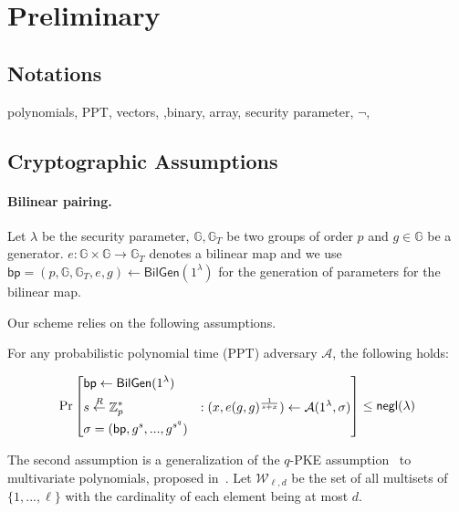 \section{Preliminary}
\label{sec::prelim}

\subsection{Notations}

polynomials, PPT, vectors, ,binary, array, security parameter, $\neg$,

\subsection{Cryptographic Assumptions}

\paragraph{Bilinear pairing.} Let $\lambda$ be the security parameter, $\mathbb{G}, \mathbb{G}_T$ be two groups of order $p$ and $g\in\mathbb{G}$ be a generator. $e: \mathbb{G}\times\mathbb{G}\rightarrow\mathbb{G}_T$ denotes a bilinear map and we use $\mathsf{bp}=(p,\mathbb{G},\mathbb{G}_T,e,g)\leftarrow\mathsf{BilGen}(1^\lambda)$ for the generation of parameters for the bilinear map.

Our scheme relies on the following assumptions.

\begin{assumption}
	\label{asp::qSDH}
	For any probabilistic polynomial time (PPT) adversary $\mathcal{A}$, the following holds:
	
	\[\Pr\left[ \begin{aligned}
	&\mathsf{bp} \leftarrow \mathsf{BilGen}(1^\lambda) & \\
	&s \overset{R}{\leftarrow} \mathbb{Z}^{*}_{p} & : (x, e(g, g)^{\frac{1}{s+x}}) \leftarrow \mathcal{A}(1^\lambda, \sigma)\\
	&\sigma = (\mathsf{bp}, g^s, ..., g^{s^q})
	\end{aligned} \right] \le {\sf negl}{(\lambda)}\]
\end{assumption}

The second assumption is a generalization of the $q$-PKE assumption~\cite{groth2010short} to multivariate polynomials, proposed in~\cite{zhang2017vsql,zkvpd}. Let $\mathcal {W}_ {\ell,d}$ be the set of all multisets of $\{1, . . . , \ell\}$ with the cardinality of each element being at most $d$. 


